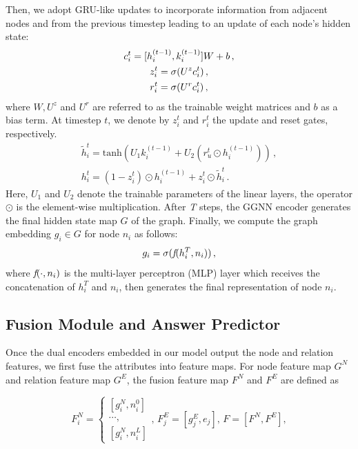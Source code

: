 \documentclass[letterpaper]{article} %
\begin{document}
Then, we adopt GRU-like updates to incorporate information from adjacent nodes and from the previous timestep leading to an update of each node's hidden state:
\begin{gather}\notag
    c_i^t = [h_i^{(t-1)}, k_{i}^{(t-1)}] W + b \, ,\\
    z_i^t = \sigma(U^z c_i^t) \, , \\\notag
    r_i^t = \sigma(U^r c_i^t)\, , \notag
\end{gather}
where $W, U^z$ and $U^r$ are referred to as the trainable weight matrices and $b$ as a bias term.
At timestep $t$, we denote by $z_i^t$ and $r_i^t$ the update and reset gates, respectively.
\begin{gather}
    \tilde{h}_i^t = \text{tanh}(U_1 k_{i}^{(t-1)} + U_2(r_u^t \odot h_i^{(t-1)})) \, ,\\
    h_i^t = (1-z_i^t)\odot h_i^{(t-1)} + z_i^t\odot \tilde{h}_i^t \, .
\end{gather}
Here, $U_1$ and $U_2$ denote the trainable parameters of the linear layers, the operator $\odot$ is the element-wise multiplication.
After \emph{T} steps, the GGNN encoder generates the final hidden state map $G$ of the graph. 
Finally, we compute the graph embedding $g_i \in G$ for node ${n}_i$ as follows:
\begin{equation}
    g_i = \sigma( \emph{f}(h_i^T, n_i)) \, ,
\end{equation}
where $\emph{f}(\cdot, n_i)$ is the multi-layer perceptron (MLP) layer which receives the concatenation of $h_i^T$ and $n_i$, then generates the final representation of node ${n}_i$. 

\subsection{Fusion Module and Answer Predictor}

Once the dual encoders embedded in our model output the node and relation features, we first fuse the attributes into feature maps. For node feature map $G^N$ and relation feature map $G^E$, the fusion feature map $F^N$ and $F^E$ are defined as

{\small \begin{equation}
F_i^N= \begin{cases}
[g_i^N, n_i^0]  \\
\cdots, \\
[g_i^N, n_i^L]
\end{cases} 
,\, F_j^E = [g_j^E, e_j] , \,
    F = [F^N, F^E]  ,
\end{equation}
}
\end{document}
